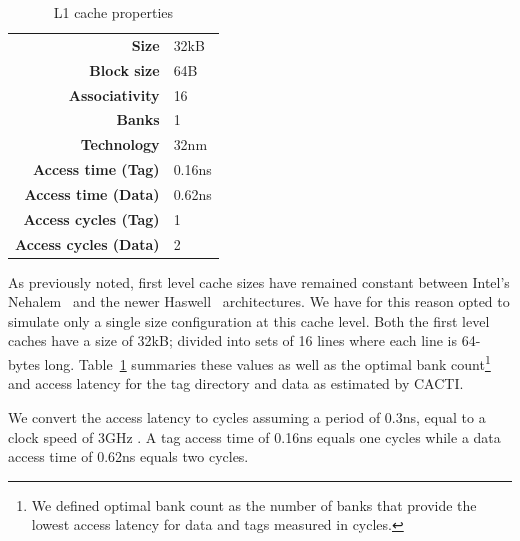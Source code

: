 \begin{table}[ht]
\centering
\begin{tabular}{rl}
\toprule
\bf{Size}               & 32kB              \\
\bf{Block size}         & 64B               \\
\bf{Associativity}      & 16                \\
\bf{Banks}              & 1                 \\
\bf{Technology}         & 32nm              \\
\bf{Access time (Tag)}  & 0.16ns \\
\bf{Access time (Data)} & 0.62ns \\
\bf{Access cycles (Tag)}  & 1 \\
\bf{Access cycles (Data)} & 2 \\
\bottomrule
\end{tabular}
\caption{L1 cache properties}
\label{tbl:processor_model:l1}
\end{table}

As previously noted, first level cache sizes have remained constant between Intel's Nehalem~\cite{Thomadakis2011} and the newer Haswell~\cite{Jain2013} architectures.
We have for this reason opted to simulate only a single size configuration at this cache level.
Both the first level caches have a size of 32kB; divided into sets of 16 lines where each line is 64-bytes long.
Table~\ref{tbl:processor_model:l1} summaries these values as well as the optimal bank count\footnote{We defined optimal bank count as the number of banks that provide the lowest access latency for data and tags measured in cycles.} and access latency for the tag directory and data as estimated by CACTI. 

We convert the access latency to cycles assuming a period of 0.3ns, equal to a clock speed of 3GHz .
A tag access time of 0.16ns equals one cycles while a data access time of 0.62ns equals two cycles.

